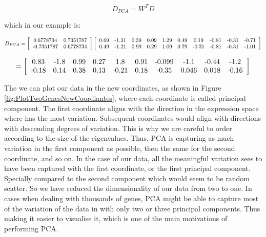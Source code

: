 \documentclass[11pt, oneside]{article}   	%
\begin{document}
\[
   D_{PCA} = W^T D
\]

\noindent which in our example is:

\[
   D_{PCA} = 
   \left[ \begin{array}{cc}
	0.6778734 & 0.7351787 \\
	$-0.7351787$ & 0.6778734
   \end{array} \right]
   \left[ \begin{array}{cccccccccc}
      0.69 & $-1.31$ & 0.39 & 0.09 & 1.29 & 0.49 & 0.19 & $-0.81$ & $-0.31$ & $-0.71$ \\
      0.49 & $-1.21$ & 0.99 & 0.29 & 1.09 & 0.79 & $-0.31$ & $-0.81$ & $-0.31$ & $-1.01$
   \end{array} \right]
\]

\[
   =
   \left[ \begin{array}{cccccccccc}
      0.83 & $-1.8$ & 0.99 & 0.27 & 1.8 & 0.91 & $-0.099$ & $-1.1$ & $-0.44$ & $-1.2$ \\
      $-0.18$ & 0.14 & 0.38 & 0.13 & $-0.21$ & 0.18 & $-0.35$ & 0.046 & 0.018 & $-0.16$
   \end{array} \right]
\]


The we can plot our data in the new coordinates, as shown in Figure \ref{fig:PlotTwoGenesNewCoordiantes}, where each coordinate is called principal component. 
The first coordinate aligns with the direction in the expression space where has the most variation. Subsequent coordinates would align with directions with descending degrees of variation. This is why we are careful to order according to the size of the eigenvalues.
Thus, PCA is capturing as much variation in the first component as possible, then the same for the second coordinate, and so on.
In the case of our data, all the meaningful variation sees to have been captured with the first coordinate, or the first principal component. Specially compared to the second component which would seem to be random scatter. So we have reduced the dimensionality of our data from two to one. In cases when dealing with thousands of genes, PCA might be able to capture most of the variation of the data in with only two or three principal components. Thus making it easier to visualise it, which is one of the main motivations of performing PCA.
\end{document}
